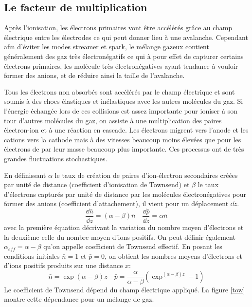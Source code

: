 \subsection{Le facteur de multiplication}
Après l'ionisation, les électrons primaires vont être accélérés grâce au champ électrique entre les électrodes ce qui peut donner lieu à une avalanche. Cependant afin d'éviter les modes streamer et spark, le mélange gazeux contient généralement des gaz très électronégatifs ce qui à pour effet de capturer certains électrons primaires, les molécule très électronégatives ayant tendance à vouloir former des anions, et de réduire ainsi la taille de l'avalanche. 

Tous les électrons non absorbés sont accélérés par le champ électrique et sont soumis à des chocs élastiques et inélastiques avec les autres molécules du gaz. Si l'énergie échangée lors de ces collisions est assez importante pour ioniser à son tour d'autres molécules du gaz, on assiste à une multiplication des paires électron-ion et à une réaction en cascade. Les électrons migrent vers l'anode et les cations vers la cathode mais à des vitesses beaucoup moins élevées que pour les électrons de par leur masse beaucoup plus importante. Ces processus ont de très grandes fluctuations stochastiques.

En définissant $\alpha$ le taux de création de paires d'ion-électron secondaires créées par unité de distance (coefficient d'ionisation de Townsend) et  $\beta$ le taux d'électrons capturés par unité de distance par les molécules électronégatives pour former des anions (coefficient d'attachement), il vient pour un déplacement  $\dd z$.
\begin{equation}
	\frac{\dd \bar{n}}{\dd z}=(\alpha-\beta)\bar{n} \quad  \frac{\dd \bar{p}}{\dd z}=\alpha\bar{n} 
\end{equation}
avec la première équation décrivant la variation du nombre moyen d'électrons et la deuxième celle du nombre moyen d'ions positifs. On peut définir également $\alpha_{eff}=\alpha-\beta$ qu'on appelle coefficient de Townsend effectif. En posant les conditions initiales $\bar{n}=1$ et $\bar{p}=0$, on obtient les nombres moyens d'électrons et d'ions positifs produits sur une distance $x$: 
\begin{equation}
\bar{n}=\exp(\alpha-\beta)z \quad \bar{p}=\frac{\alpha}{\alpha-\beta}\left(\exp^{(\alpha-\beta)z}-1\right)
\end{equation}
Le coefficient de Townsend dépend du champ électrique appliqué. La figure \ref{tow} montre cette dépendance pour un mélange de gaz.

